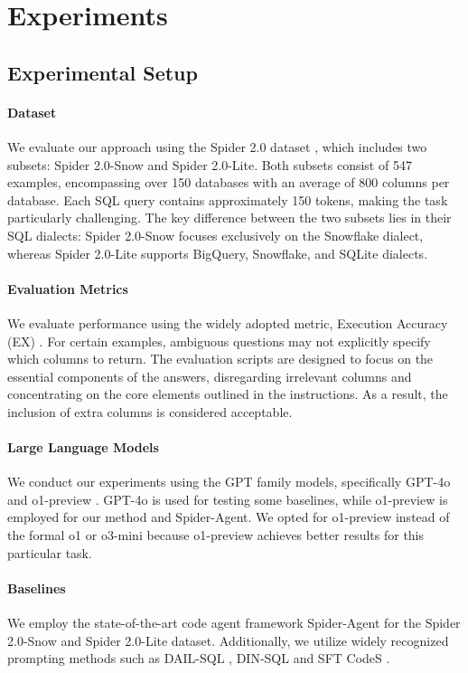 \section{Experiments}

\subsection{Experimental Setup}

\paragraph{Dataset} 
We evaluate our approach using the Spider 2.0 dataset \citep{lei2024spider}, which includes two subsets: Spider 2.0-Snow and Spider 2.0-Lite. Both subsets consist of 547 examples, encompassing over 150 databases with an average of 800 columns per database. Each SQL query contains approximately 150 tokens, making the task particularly challenging. The key difference between the two subsets lies in their SQL dialects: Spider 2.0-Snow focuses exclusively on the Snowflake dialect, whereas Spider 2.0-Lite supports BigQuery, Snowflake, and SQLite dialects. 

\paragraph{Evaluation Metrics}  We evaluate performance using the widely adopted metric, Execution Accuracy (EX) \citep{yu2018spider, li2024can}. For certain examples, ambiguous questions may not explicitly specify which columns to return. The evaluation scripts are designed to focus on the essential components of the answers, disregarding irrelevant columns and concentrating on the core elements outlined in the instructions. As a result, the inclusion of extra columns is considered acceptable.

\paragraph{Large Language Models} We conduct our experiments using the GPT family models, specifically GPT-4o \citep{achiam2023gpt} and o1-preview \citep{openai2024api}. GPT-4o is used for testing some baselines, while o1-preview is employed for our method and Spider-Agent. We opted for o1-preview instead of the formal o1 or o3-mini because o1-preview achieves better results for this particular task.

\paragraph{Baselines} We employ the state-of-the-art code agent framework Spider-Agent \citep{lei2024spider} for the Spider 2.0-Snow and Spider 2.0-Lite dataset. Additionally, we utilize widely recognized prompting methods such as DAIL-SQL \citep{gao2023text}, DIN-SQL \citep{pourreza2024din} and SFT CodeS \citep{CodeS}.

